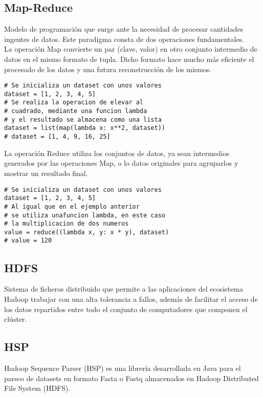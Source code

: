 \documentclass[conference]{IEEEtran}
\begin{document}
\subsection{Map-Reduce}
Modelo de programación que surge ante la necesidad de procesar cantidades ingentes de datos. Este paradigma consta de dos operaciones fundamentales.\\

La operación Map convierte un par (clave, valor) en otro conjunto intermedio de datos en el mismo formato de tupla. Dicho formato hace mucho más eficiente el procesado de los datos y una futura reconstrucción de los mismos.\\

\begin{lstlisting}[caption=Ejemplo de código Map]
# Se inicializa un dataset con unos valores
dataset = [1, 2, 3, 4, 5]
# Se realiza la operacion de elevar al 
# cuadrado, mediante una funcion lambda
# y el resultado se almacena como una lista
dataset = list(map(lambda x: x**2, dataset))
# dataset = [1, 4, 9, 16, 25]
\end{lstlisting}

La operación Reduce utiliza los conjuntos de datos, ya sean intermedios generados por las operaciones Map, o lo datos originales para agruparlos y mostrar un resultado final.

\begin{lstlisting}[caption=Ejemplo de código Reduce]
# Se inicializa un dataset con unos valores
dataset = [1, 2, 3, 4, 5]
# Al igual que en el ejemplo anterior 
# se utiliza unafuncion lambda, en este caso
# la multiplicacion de dos numeros
value = reduce((lambda x, y: x * y), dataset)
# value = 120
\end{lstlisting}

\subsection{HDFS}
Sistema de ficheros distribuido que permite a las aplicaciones del ecosistema Hadoop trabajar con una alta tolerancia a fallos, además de facilitar el acceso de los datos repartidos entre todo el conjunto de computadores que componen el clúster.

\subsection{HSP}
Hadoop Sequence Parser (HSP) es una librería desarrollada en Java para el parseo de datasets en formato Fasta o Fastq almacenados en Hadoop Distributed File System (HDFS).
\end{document}
